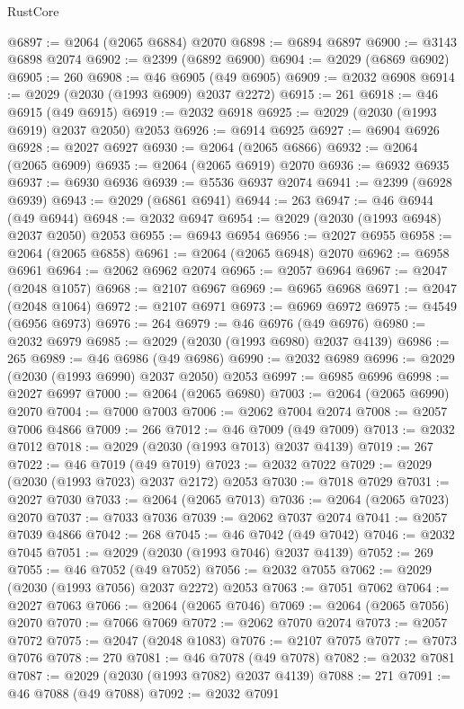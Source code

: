 \begin{lexlean}{RustCore}
\begin{coremodule}
@6897 := @2064 (@2065 @6884) @2070
@6898 := @6894 @6897
@6900 := @3143 @6898 @2074
@6902 := @2399 (@6892 @6900)
@6904 := @2029 (@6869 @6902)
@6905 := 260
@6908 := @46 @6905 (@49 @6905)
@6909 := @2032 @6908
@6914 := @2029 (@2030 (@1993 @6909) @2037 @2272)
@6915 := 261
@6918 := @46 @6915 (@49 @6915)
@6919 := @2032 @6918
@6925 := @2029 (@2030 (@1993 @6919) @2037 @2050) @2053
@6926 := @6914 @6925
@6927 := @6904 @6926
@6928 := @2027 @6927
@6930 := @2064 (@2065 @6866)
@6932 := @2064 (@2065 @6909)
@6935 := @2064 (@2065 @6919) @2070
@6936 := @6932 @6935
@6937 := @6930 @6936
@6939 := @5536 @6937 @2074
@6941 := @2399 (@6928 @6939)
@6943 := @2029 (@6861 @6941)
@6944 := 263
@6947 := @46 @6944 (@49 @6944)
@6948 := @2032 @6947
@6954 := @2029 (@2030 (@1993 @6948) @2037 @2050) @2053
@6955 := @6943 @6954
@6956 := @2027 @6955
@6958 := @2064 (@2065 @6858)
@6961 := @2064 (@2065 @6948) @2070
@6962 := @6958 @6961
@6964 := @2062 @6962 @2074
@6965 := @2057 @6964
@6967 := @2047 (@2048 @1057)
@6968 := @2107 @6967
@6969 := @6965 @6968
@6971 := @2047 (@2048 @1064)
@6972 := @2107 @6971
@6973 := @6969 @6972
@6975 := @4549 (@6956 @6973)
@6976 := 264
@6979 := @46 @6976 (@49 @6976)
@6980 := @2032 @6979
@6985 := @2029 (@2030 (@1993 @6980) @2037 @4139)
@6986 := 265
@6989 := @46 @6986 (@49 @6986)
@6990 := @2032 @6989
@6996 := @2029 (@2030 (@1993 @6990) @2037 @2050) @2053
@6997 := @6985 @6996
@6998 := @2027 @6997
@7000 := @2064 (@2065 @6980)
@7003 := @2064 (@2065 @6990) @2070
@7004 := @7000 @7003
@7006 := @2062 @7004 @2074
@7008 := @2057 @7006 @4866
@7009 := 266
@7012 := @46 @7009 (@49 @7009)
@7013 := @2032 @7012
@7018 := @2029 (@2030 (@1993 @7013) @2037 @4139)
@7019 := 267
@7022 := @46 @7019 (@49 @7019)
@7023 := @2032 @7022
@7029 := @2029 (@2030 (@1993 @7023) @2037 @2172) @2053
@7030 := @7018 @7029
@7031 := @2027 @7030
@7033 := @2064 (@2065 @7013)
@7036 := @2064 (@2065 @7023) @2070
@7037 := @7033 @7036
@7039 := @2062 @7037 @2074
@7041 := @2057 @7039 @4866
@7042 := 268
@7045 := @46 @7042 (@49 @7042)
@7046 := @2032 @7045
@7051 := @2029 (@2030 (@1993 @7046) @2037 @4139)
@7052 := 269
@7055 := @46 @7052 (@49 @7052)
@7056 := @2032 @7055
@7062 := @2029 (@2030 (@1993 @7056) @2037 @2272) @2053
@7063 := @7051 @7062
@7064 := @2027 @7063
@7066 := @2064 (@2065 @7046)
@7069 := @2064 (@2065 @7056) @2070
@7070 := @7066 @7069
@7072 := @2062 @7070 @2074
@7073 := @2057 @7072
@7075 := @2047 (@2048 @1083)
@7076 := @2107 @7075
@7077 := @7073 @7076
@7078 := 270
@7081 := @46 @7078 (@49 @7078)
@7082 := @2032 @7081
@7087 := @2029 (@2030 (@1993 @7082) @2037 @4139)
@7088 := 271
@7091 := @46 @7088 (@49 @7088)
@7092 := @2032 @7091

\end{coremodule}
\end{lexlean}

